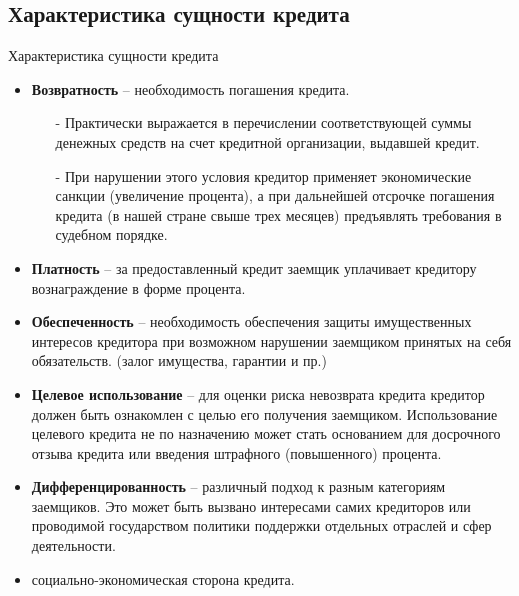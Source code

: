 \documentclass[_DKB_p2_Credit.tex]{subfiles}
\begin{document}
\subsection{Характеристика сущности кредита}
\begin{frame}[allowframebreaks]{Характеристика сущности кредита}
\begin{itemize}
\item
\textbf{Возвратность }– необходимость погашения кредита. 
\begin{enumerate}
\item[-]
Практически выражается в перечислении соответствующей суммы денежных средств на счет кредитной организации, выдавшей кредит.
\item[-]
При нарушении этого условия кредитор применяет экономические санкции (увеличение процента), а при дальнейшей отсрочке погашения кредита (в нашей стране свыше трех месяцев) предъявлять требования в судебном порядке.
\end{enumerate}
\pagebreak
\item
\textbf{Платность }– за предоставленный кредит заемщик уплачивает кредитору вознаграждение в форме процента.
\item
\textbf{Обеспеченность }– необходимость обеспечения защиты имущественных интересов кредитора при возможном нарушении заемщиком принятых на себя обязательств. (залог имущества, гарантии и пр.)
\pagebreak
\item
\textbf{Целевое использование }– для оценки риска невозврата кредита кредитор должен быть ознакомлен с целью его получения заемщиком. Использование целевого кредита не по назначению может стать основанием для досрочного отзыва кредита или введения штрафного (повышенного) процента.
\item
\textbf{Дифференцированность }– различный подход к разным категориям заемщиков. Это может быть вызвано интересами самих кредиторов или проводимой государством политики поддержки отдельных отраслей и сфер деятельности.
\item
социально-экономическая сторона кредита.
\end{itemize}
\end{frame}

\end{document}
